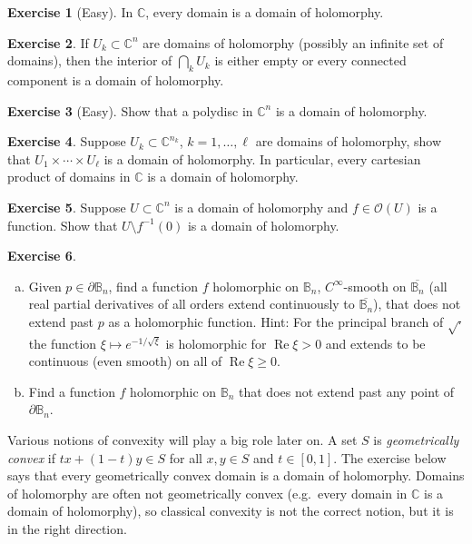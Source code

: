 \documentclass[12pt,openany]{book}
\renewcommand{\Re}{\operatorname{Re}}
\newcommand{\C}{{\mathbb{C}}}
\newcommand{\bB}{{\mathbb{B}}}
\newcommand{\sO}{{\mathscr{O}}}
\newcommand{\myindex}[1]{#1\index{#1}}
\theoremstyle{plain}
\theoremstyle{remark}
\theoremstyle{definition}
\newenvironment{exbox}{%
    \def\FrameCommand{\vrule width 1pt \relax\hspace{10pt}}%
    \MakeFramed{\advance\hsize-\width\FrameRestore}%
}{%
    \endMakeFramed
}
\newenvironment{exparts}{%
    \leavevmode\begin{enumerate}[a),noitemsep,topsep=0pt,parsep=0pt,partopsep=0pt]
}{%
    \end{enumerate}
}
\theoremstyle{exercise}
\newtheorem{exercise}{Exercise}[section]
\theoremstyle{example}
\begin{document}
\begin{exbox}
\begin{exercise}[Easy]
In $\C$, every domain is a domain of holomorphy.
\end{exercise}

\begin{exercise}
If $U_k \subset \C^n$ are domains of holomorphy (possibly an infinite set of
domains), then the interior of
$\bigcap_{k} U_k$
is either empty or every connected component is a domain of holomorphy.
\end{exercise}

\begin{exercise}[Easy]
Show that a polydisc in $\C^n$ is a domain of holomorphy.
\end{exercise}

\begin{exercise} \label{exercise:cartesianproddomofhol}
Suppose $U_k \subset \C^{n_k}$, $k=1,\ldots,\ell$ are domains of holomorphy,
show that
$U_1 \times \cdots \times U_\ell$ is a domain of holomorphy.
In particular, every cartesian product of domains in $\C$ is a domain of
holomorphy.
\end{exercise}

\begin{exercise}
Suppose $U \subset \C^n$ is a domain of holomorphy and $f \in \sO(U)$
is a function.  Show that $U \setminus f^{-1}(0)$ is a domain of holomorphy.
\end{exercise}

\begin{exercise}
\begin{exparts}
\item
Given $p \in \partial \bB_n$, find a function $f$ holomorphic on
$\bB_n$,
$C^\infty$-smooth on $\overline{\bB_n}$ (all real partial derivatives of
all orders extend
continuously to $\overline{\bB_n}$), that does not extend past $p$
as a holomorphic function.
Hint: For the principal branch of $\sqrt{\cdot}$ the function $\xi \mapsto
e^{-1/\sqrt{\xi}}$ is holomorphic for $\Re \xi > 0$ and extends to
be continuous (even smooth) on all of $\Re \xi \geq 0$.
\item
Find a function $f$ holomorphic on $\bB_n$
that does not extend past any point of
$\partial \bB_n$.
\end{exparts}
\end{exercise}
\end{exbox}

Various notions of convexity will play a big role later on.
A set $S$ is \emph{\myindex{geometrically convex}}
if $t x + (1-t)y \in S$
for all $x,y \in S$ and $t \in [0,1]$.
The exercise below
says that every geometrically convex domain is a domain of holomorphy.
Domains of holomorphy are often not geometrically convex
(e.g.\ every domain in $\C$ is a domain of holomorphy),
so classical convexity is not the correct notion, but it is
in the right direction.
\end{document}
